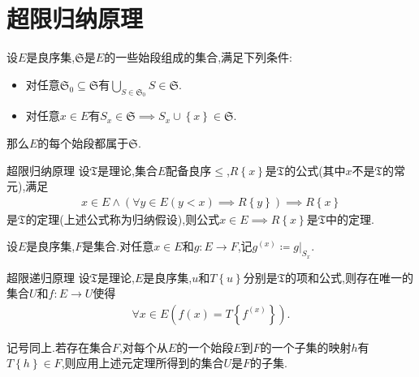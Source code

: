 \section{超限归纳原理}

\begin{lemma}{}{}
	设$E$是良序集,$\mathfrak{S}$是$E$的一些始段组成的集合,满足下列条件:
	\begin{itemize}
		\item 对任意$\mathfrak{S}_{0}\subseteq\mathfrak{S}$有$\bigcup\limits_{S\in\mathfrak{S}_{0}}S\in\mathfrak{S}$.
		\item 对任意$x\in E$有$S_{x}\in\mathfrak{S}\implies S_{x}\cup\left\{x\right\}\in\mathfrak{S}$.
	\end{itemize}
	那么$E$的每个始段都属于$\mathfrak{S}$.
\end{lemma}

\begin{metatheorem}{超限归纳原理}{}
	设$\mathfrak{T}$是理论,集合$E$配备良序$\leq$,$R\left\{x\right\}$是$\mathfrak{T}$的公式(其中$x$不是$\mathfrak{T}$的常元),满足
	\begin{align*}
		x\in E\wedge\left(\forall y\in E\left(y<x\right)\implies R\left\{y\right\}\right)\implies R\left\{x\right\}
	\end{align*}
	是$\mathfrak{T}$的定理(上述公式称为归纳假设),则公式$x\in E\implies R\left\{x\right\}$是$\mathfrak{T}$中的定理.
\end{metatheorem}

\begin{definition}{}{}
	设$E$是良序集,$F$是集合.对任意$x\in E$和$g:E\to F$,记$g^{\left(x\right)}\coloneq g|_{S_{x}}$.
\end{definition}

\begin{metatheorem}{超限递归原理}{}
	设$\mathfrak{T}$是理论,$E$是良序集,$u$和$T\left\{u\right\}$分别是$\mathfrak{T}$的项和公式,则存在唯一的集合$U$和$f:E\to U$使得
	\begin{align*}
		\forall x\in E\left(f\left(x\right)=T\left\{f^{\left(x\right)}\right\}\right).
	\end{align*}
\end{metatheorem}

\begin{remark}{}{}
	记号同上.若存在集合$F$,对每个从$E$的一个始段$E$到$F$的一个子集的映射$h$有$T\left\{h\right\}\in F$,则应用上述元定理所得到的集合$U$是$F$的子集.
\end{remark}

















































